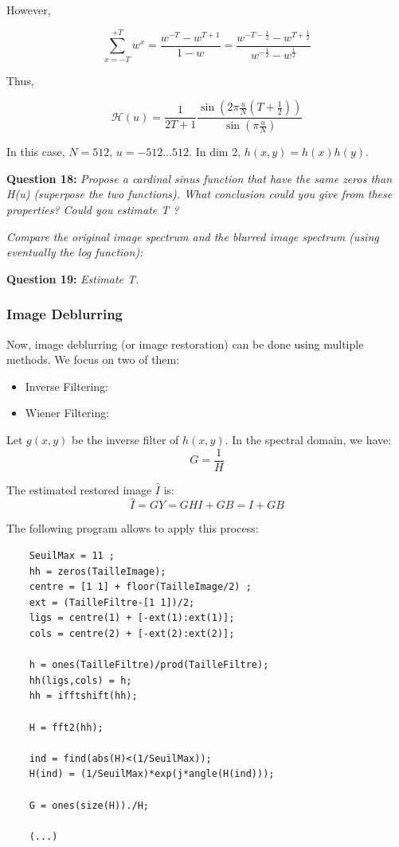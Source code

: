 However,

\[
\sum_{x=-T}^{+T} w^x = \frac{w^{-T} - w^{T+1}}{1 - w} = \frac{w^{-T-\frac{1}{2}} - w^{T+\frac{1}{2}}}{w^{-\frac{1}{2}} - w^{\frac{1}{2}}}
\]

Thus,

\[
\mathcal{H}(u) = \frac{1}{2T+1} \frac{\sin\left(2\pi \frac{u}{N} (T + \frac{1}{2})\right)}{\sin\left(\pi \frac{u}{N}\right)}
\]

In this case, $N = 512$, $u = -512 \dots 512$. In dim 2, $h(x,y) = h(x)h(y)$.

\textbf{Question 18:}
\textit{Propose a cardinal sinus function that have the same zeros than H(u) (superpose the two functions). What conclusion could you give from these properties? Could you estimate T ?}

\TODO{}

\textit{Compare the original image spectrum and the blurred image spectrum (using eventually the log function):}



\textbf{Question 19:} \textit{Estimate T.}

\TODO{}


\subsubsection{Image Deblurring}

Now, image deblurring (or image restoration) can be done using multiple methods. We focus on two of them:
\begin{itemize}
    \item Inverse Filtering: 
    \item Wiener Filtering: 
\end{itemize}

Let $g(x, y)$ be the inverse filter of $h(x, y)$. In the spectral domain, we have:
\begin{equation}
    G = \frac{1}{H}
\end{equation}

The estimated restored image $\hat{I}$ is:
\begin{equation}
    \hat{I} = GY = GHI + GB = I + GB
\end{equation}

The following program allows to apply this process:
\begin{lstlisting}
    SeuilMax = 11 ;
    hh = zeros(TailleImage);
    centre = [1 1] + floor(TailleImage/2) ;
    ext = (TailleFiltre-[1 1])/2;
    ligs = centre(1) + [-ext(1):ext(1)];
    cols = centre(2) + [-ext(2):ext(2)];
    
    h = ones(TailleFiltre)/prod(TailleFiltre);
    hh(ligs,cols) = h;
    hh = ifftshift(hh);
    
    H = fft2(hh);
    
    ind = find(abs(H)<(1/SeuilMax));
    H(ind) = (1/SeuilMax)*exp(j*angle(H(ind)));
    
    G = ones(size(H))./H;
    
    (...)
\end{lstlisting}


